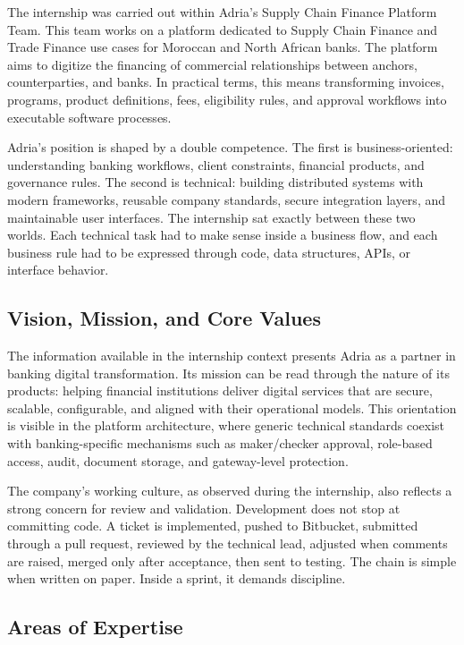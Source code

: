 The internship was carried out within Adria's Supply Chain Finance Platform Team. This team works on a platform dedicated to Supply Chain Finance and Trade Finance use cases for Moroccan and North African banks. The platform aims to digitize the financing of commercial relationships between anchors, counterparties, and banks. In practical terms, this means transforming invoices, programs, product definitions, fees, eligibility rules, and approval workflows into executable software processes.

Adria's position is shaped by a double competence. The first is business-oriented: understanding banking workflows, client constraints, financial products, and governance rules. The second is technical: building distributed systems with modern frameworks, reusable company standards, secure integration layers, and maintainable user interfaces. The internship sat exactly between these two worlds. Each technical task had to make sense inside a business flow, and each business rule had to be expressed through code, data structures, APIs, or interface behavior.

\subsection{Vision, Mission, and Core Values}
\label{subsec:vision_mission}

The information available in the internship context presents Adria as a partner in banking digital transformation. Its mission can be read through the nature of its products: helping financial institutions deliver digital services that are secure, scalable, configurable, and aligned with their operational models. This orientation is visible in the platform architecture, where generic technical standards coexist with banking-specific mechanisms such as maker/checker approval, role-based access, audit, document storage, and gateway-level protection.

The company's working culture, as observed during the internship, also reflects a strong concern for review and validation. Development does not stop at committing code. A ticket is implemented, pushed to Bitbucket, submitted through a pull request, reviewed by the technical lead, adjusted when comments are raised, merged only after acceptance, then sent to testing. The chain is simple when written on paper. Inside a sprint, it demands discipline.

\subsection{Areas of Expertise}
\label{subsec:areas_expertise}

